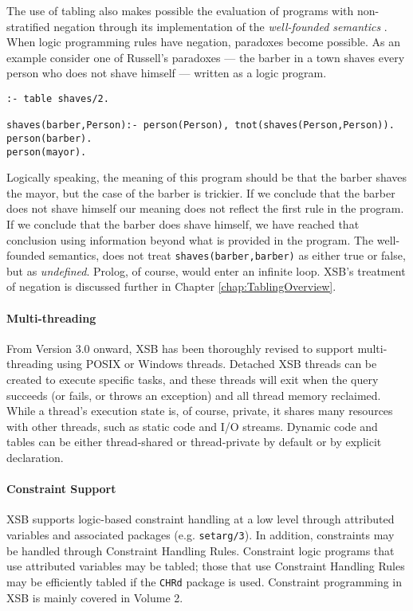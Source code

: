 \begin{example} \label{ex:Russell}
The use of tabling also makes possible the evaluation of programs with
non-stratified negation through its implementation of the {\em
well-founded semantics} \cite{VGRS91}.  When logic programming rules
have negation, paradoxes become possible.  As an example consider one
of Russell's paradoxes --- 
the barber in a town shaves every person who does not shave himself ---
written as a logic program.
\begin{center}
\begin{verbatim} 
:- table shaves/2.

shaves(barber,Person):- person(Person), tnot(shaves(Person,Person)).
person(barber).
person(mayor).
\end{verbatim} 
\end{center}
Logically speaking, the meaning of this program should be that the
barber shaves 
the mayor, but the case of the barber is trickier.  If we conclude
that the barber does not shave himself our meaning does not reflect the 
first rule in the program.  If we conclude that the barber does shave
himself, we have reached that conclusion using information beyond what 
is provided in the program.  The well-founded semantics, does not
treat {\tt shaves(barber,barber)} as either true or false, but as {\em
undefined}. 
Prolog, of course, would enter an infinite loop.  XSB's treatment of
negation is discussed further in Chapter \ref{chap:TablingOverview}.
\end{example}

\paragraph{Multi-threading} From Version 3.0 onward, XSB has been thoroughly
revised to support multi-threading using POSIX or Windows threads.
Detached XSB threads can be created to execute specific tasks, and
these threads will exit when the query succeeds (or fails, or throws
an exception) and all thread memory reclaimed.  While a thread's
execution state is, of course, private, it shares many resources with
other threads, such as static code and I/O streams.  Dynamic code and
tables can be either thread-shared or thread-private by default or by
explicit declaration.

\paragraph{Constraint Support}
%
XSB supports logic-based constraint handling at a low level through
attributed variables and associated packages (e.g. {\tt setarg/3}).  In
addition, constraints may be handled through Constraint Handling
Rules.  Constraint logic programs that use attributed variables may be
tabled; those that use Constraint Handling Rules may be efficiently
tabled if the {\tt CHRd} package is used.  Constraint programming in
XSB is mainly covered in Volume 2.

